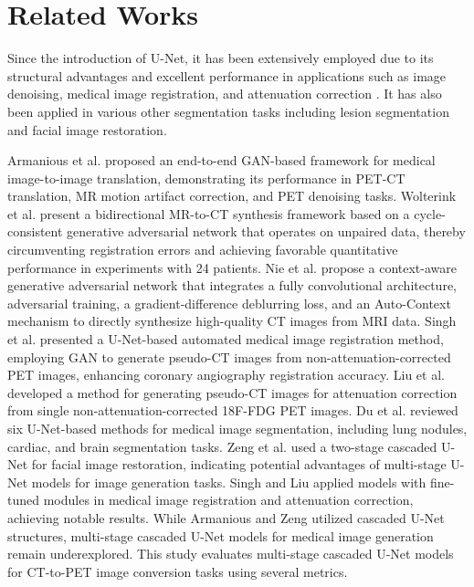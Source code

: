 \documentclass[a4paper, times, 10pt,twocolumn]{article}
\begin{document}
\section{Related Works}
Since the introduction of U-Net, it has been extensively employed due to its structural advantages and excellent performance in applications such as image denoising\cite{lehtinen_noise2noise_2018}, medical image registration, and attenuation correction \cite{balakrishnan_voxelmorph_2019}. It has also been applied in various other segmentation tasks including lesion segmentation and facial image restoration.

Armanious et al. \cite{armanious_medgan_2020} proposed an end-to-end GAN-based framework for medical image-to-image translation, demonstrating its performance in PET-CT translation, MR motion artifact correction, and PET denoising tasks. Wolterink et al. \cite{tsaftaris_deep_2017} present a bidirectional MR-to-CT synthesis framework based on a cycle-consistent generative adversarial network that operates on unpaired data, thereby circumventing registration errors and achieving favorable quantitative performance in experiments with 24 patients. Nie et al. \cite{descoteaux_medical_2017} propose a context-aware generative adversarial network that integrates a fully convolutional architecture, adversarial training, a gradient-difference deblurring loss, and an Auto-Context mechanism to directly synthesize high-quality CT images from MRI data.
Singh et al. \cite{singh_automated_2023} presented a U-Net-based automated medical image registration method, employing GAN to generate pseudo-CT images from non-attenuation-corrected PET images, enhancing coronary angiography registration accuracy. Liu et al. \cite{liu_deep_2018} developed a method for generating pseudo-CT images for attenuation correction from single non-attenuation-corrected 18F-FDG PET images. Du et al. \cite{du_medical_2020} reviewed six U-Net-based methods for medical image segmentation, including lung nodules, cardiac, and brain segmentation tasks. Zeng et al. \cite{zeng_swin-casunet_2022} used a two-stage cascaded U-Net for facial image restoration, indicating potential advantages of multi-stage U-Net models for image generation tasks. Singh and Liu applied models with fine-tuned modules in medical image registration and attenuation correction, achieving notable results. While Armanious and Zeng utilized cascaded U-Net structures, multi-stage cascaded U-Net models for medical image generation remain underexplored. This study evaluates multi-stage cascaded U-Net models for CT-to-PET image conversion tasks using several metrics.
\end{document}
